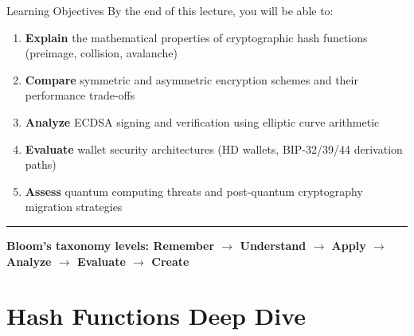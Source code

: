 \documentclass[8pt,aspectratio=169]{beamer}
\newcommand{\bottomnote}[1]{\vfill\vspace{-2mm}\textcolor{mllavender2}{\rule{\textwidth}{0.4pt}}\vspace{1mm}\footnotesize\textbf{#1}}
\begin{document}
\begin{frame}{Learning Objectives}
By the end of this lecture, you will be able to:
\begin{enumerate}
\item \textbf{Explain} the mathematical properties of cryptographic hash functions (preimage, collision, avalanche)
\item \textbf{Compare} symmetric and asymmetric encryption schemes and their performance trade-offs
\item \textbf{Analyze} ECDSA signing and verification using elliptic curve arithmetic
\item \textbf{Evaluate} wallet security architectures (HD wallets, BIP-32/39/44 derivation paths)
\item \textbf{Assess} quantum computing threats and post-quantum cryptography migration strategies
\end{enumerate}
\bottomnote{Bloom's taxonomy levels: Remember $\rightarrow$ Understand $\rightarrow$ Apply $\rightarrow$ Analyze $\rightarrow$ Evaluate $\rightarrow$ Create}
\end{frame}

\section{Hash Functions Deep Dive}
\end{document}
